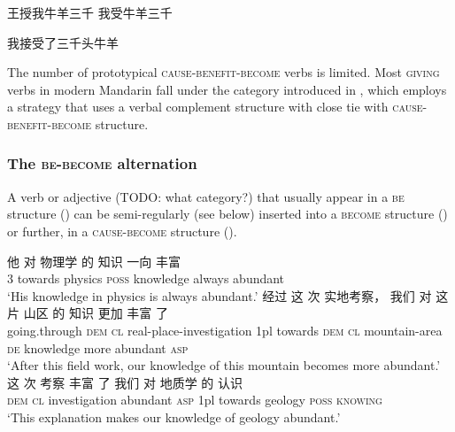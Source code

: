 \documentclass[UTF8, a4paper, oneside, scheme=plain, 12pt]{ctexrep}
\newcommand{\translate}[1]{`#1'}
\newcommand*{\category}[1]{\textsc{#1}}
\begin{document}
\begin{exe}
    \ex \label{ex:verb-phrase.experience.oc-1} \begin{xlist}
        \ex 王授我牛羊三千
        \ex\label{ex:verb-phrase.experience.oc-1b} 我受牛羊三千
    \end{xlist}
    \ex \label{ex:verb-phrase.experience.oc-to-m-1} 我接受了三千头牛羊
\end{exe}

The number of prototypical 
\category{cause}-\category{benefit}-\category{become} verbs 
is limited.
Most \category{giving} verbs in modern Mandarin 
fall under the category introduced in ,
which employs a strategy 
that uses a verbal complement structure 
with close tie with \category{cause}-\category{benefit}-\category{become} structure.

\subsubsection{The \category{be}-\category{become} alternation}

A verb or adjective (TODO: what category?) that usually appear in a \category{be} structure 
()
can be semi-regularly (see below) inserted into a \category{become} structure 
()
or further, in a \category{cause}-\category{become} structure 
().

\begin{exe}
    \ex\label{ex:verb-phrase.be-become.source-1} 
    \gll 他 对 物理学 的 知识 一向 丰富 \\
    3 towards physics \category{poss} knowledge always abundant \\
    \glt \translate{His knowledge in physics is always abundant.} 
    \ex\label{ex:verb-phrase.be-become.1} 
    \gll 经过 这 次 实地考察， 我们 对 这 片 山区 的 知识 更加 丰富 了 \\
    going.through \category{dem} \category{cl} real-place-investigation 
    1pl towards \category{dem} \category{cl} mountain-area \category{de} knowledge 
    more abundant \category{asp} \\
    \glt \translate{After this field work, our knowledge of this mountain 
    becomes more abundant.}
    \ex\label{ex:verb-phrase.be-become.cause-1}
    \gll 这 次 考察 丰富 了 我们 对 地质学 的 认识 \\
    \category{dem} \category{cl} investigation abundant \category{asp} 1pl towards geology \category{poss} \category{knowing} \\ 
    \glt \translate{This explanation makes our knowledge of geology abundant.}
\end{exe}
\end{document}
